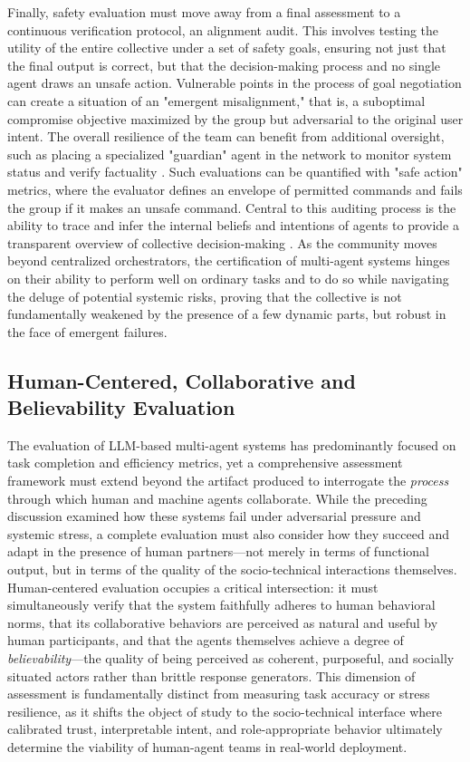 \documentclass[11pt,a4paper]{article}
\begin{document}
Finally, safety evaluation must move away from a final assessment to a continuous verification protocol, an alignment audit. This involves testing the utility of the entire collective under a set of safety goals, ensuring not just that the final output is correct, but that the decision-making process and no single agent draws an unsafe action. Vulnerable points in the process of goal negotiation can create a situation of an "emergent misalignment," that is, a suboptimal compromise objective maximized by the group but adversarial to the original user intent. The overall resilience of the team can benefit from additional oversight, such as placing a specialized "guardian" agent in the network to monitor system status and verify factuality \cite{arxiv:2407.07791v2}. Such evaluations can be quantified with "safe action" metrics, where the evaluator defines an envelope of permitted commands and fails the group if it makes an unsafe command. Central to this auditing process is the ability to trace and infer the internal beliefs and intentions of agents to provide a transparent overview of collective decision-making \cite{arxiv:1901.06085v1}. As the community moves beyond centralized orchestrators, the certification of multi-agent systems hinges on their ability to perform well on ordinary tasks and to do so while navigating the deluge of potential systemic risks, proving that the collective is not fundamentally weakened by the presence of a few dynamic parts, but robust in the face of emergent failures.


\subsection{Human-Centered, Collaborative and Believability Evaluation}


The evaluation of LLM-based multi-agent systems has predominantly focused on task completion and efficiency metrics, yet a comprehensive assessment framework must extend beyond the artifact produced to interrogate the \emph{process} through which human and machine agents collaborate. While the preceding discussion examined how these systems fail under adversarial pressure and systemic stress, a complete evaluation must also consider how they succeed and adapt in the presence of human partners---not merely in terms of functional output, but in terms of the quality of the socio-technical interactions themselves. Human-centered evaluation occupies a critical intersection: it must simultaneously verify that the system faithfully adheres to human behavioral norms, that its collaborative behaviors are perceived as natural and useful by human participants, and that the agents themselves achieve a degree of \emph{believability}---the quality of being perceived as coherent, purposeful, and socially situated actors rather than brittle response generators. This dimension of assessment is fundamentally distinct from measuring task accuracy or stress resilience, as it shifts the object of study to the socio-technical interface where calibrated trust, interpretable intent, and role-appropriate behavior ultimately determine the viability of human-agent teams in real-world deployment.
\end{document}
